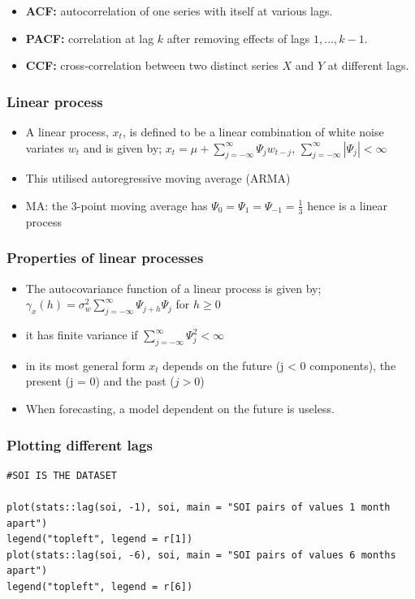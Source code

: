 \documentclass{article}
\begin{document}
\begin{itemize}
  \item[\(\bullet\)] \textbf{ACF:} autocorrelation of one series with itself at various lags.
  \item[\(\bullet\)] \textbf{PACF:} correlation at lag \(k\) after removing effects of lags \(1,\dots,k-1\).
  \item[\(\bullet\)] \textbf{CCF:} cross‐correlation between two distinct series \(X\) and \(Y\) at different lags.
\end{itemize}



\subsubsection{Linear process}
\begin{itemize}
    \item A linear process, $x_t$, is defined to be a linear combination of white noise variates $w_t$ and is given by;
    \subitem $x_t = \mu + \sum_{j= - \infty}^\infty \Psi_j w_{t-j}$, \hspace{1cm} $\sum_{j= - \infty}^\infty |\Psi_j| < \infty$
    \item This utilised autoregressive moving average (ARMA)
    \item MA: the 3-point moving average has $\Psi_0 = \Psi_1 = \Psi_{-1} = \frac{1}{3}$ hence is a linear process
\end{itemize}

\subsubsection{Properties of linear processes}
\begin{itemize}
    \item The autocovariance function of a linear process is given by;
    \subitem $\gamma_x (h) = \sigma^2_w \sum_{j = -\infty}^\infty \Psi_{j+h} \Psi_j$ \hspace{1cm} for $h \geq 0$
    \item it has finite variance if $\sum_{j=-\infty}^\infty \Psi^2_j < \infty$
    \item in its most general form $x_t$ depends on the future (j < 0 components), the present (j = 0) and the past ($j > 0$)
    \item When forecasting, a model dependent on the future is useless.
\end{itemize}

\subsubsection{Plotting different lags}
\begin{lstlisting}
#SOI IS THE DATASET

plot(stats::lag(soi, -1), soi, main = "SOI pairs of values 1 month apart")
legend("topleft", legend = r[1])
plot(stats::lag(soi, -6), soi, main = "SOI pairs of values 6 months apart")
legend("topleft", legend = r[6])

\end{lstlisting}
\end{document}
